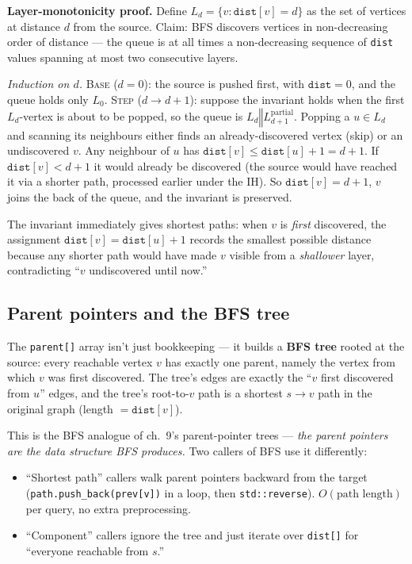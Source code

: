\documentclass[11pt]{article}
\begin{document}
\begin{notebox}
\textbf{Layer-monotonicity proof.} Define $L_d = \{v : \texttt{dist}[v] = d\}$ as
the set of vertices at distance $d$ from the source. Claim: BFS
discovers vertices in non-decreasing order of distance --- the queue
is at all times a non-decreasing sequence of \texttt{dist} values
spanning at most two consecutive layers.

\emph{Induction on $d$.} \textsc{Base} ($d = 0$): the source is
pushed first, with $\texttt{dist} = 0$, and the queue holds only
$L_0$. \textsc{Step} ($d \to d{+}1$): suppose the invariant holds
when the first $L_d$-vertex is about to be popped, so the queue is
$L_d \mathbin\Vert L_{d+1}^{\text{partial}}$. Popping a $u \in L_d$
and scanning its neighbours either finds an already-discovered
vertex (skip) or an undiscovered $v$. Any neighbour of $u$ has
$\texttt{dist}[v] \le \texttt{dist}[u] + 1 = d + 1$. If
$\texttt{dist}[v] < d+1$ it would already be discovered (the source
would have reached it via a shorter path, processed earlier under
the IH). So $\texttt{dist}[v] = d+1$, $v$ joins the back of the
queue, and the invariant is preserved.

The invariant immediately gives shortest paths: when $v$ is
\emph{first} discovered, the assignment $\texttt{dist}[v] =
\texttt{dist}[u] + 1$ records the smallest possible distance
because any shorter path would have made $v$ visible from a
\emph{shallower} layer, contradicting ``$v$ undiscovered until
now.''
\end{notebox}

\subsection*{Parent pointers and the BFS tree}

The \texttt{parent[]} array isn't just bookkeeping --- it builds a
\textbf{BFS tree} rooted at the source: every reachable vertex $v$
has exactly one parent, namely the vertex from which $v$ was first
discovered. The tree's edges are exactly the ``$v$ first discovered
from $u$'' edges, and the tree's root-to-$v$ path is a shortest
$s \to v$ path in the original graph (length $= \texttt{dist}[v]$).

This is the BFS analogue of ch.~9's parent-pointer trees ---
\emph{the parent pointers \emph{are} the data structure BFS produces.}
Two callers of BFS use it differently:
\begin{itemize}[leftmargin=*]
    \item ``Shortest path'' callers walk parent pointers backward
          from the target (\texttt{path.push\_back(prev[v])} in a
          loop, then \texttt{std::reverse}). $O(\text{path length})$
          per query, no extra preprocessing.
    \item ``Component'' callers ignore the tree and just iterate
          over \texttt{dist[]} for ``everyone reachable from $s$.''
\end{itemize}
\end{document}

